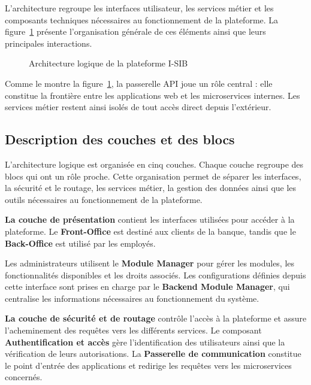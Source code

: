 L'architecture regroupe les interfaces utilisateur, les services métier et les composants techniques nécessaires au fonctionnement de la plateforme. La figure~\ref{fig:architecture_logique} présente l'organisation générale de ces éléments ainsi que leurs principales interactions.




\begin{figure}[H]
    \centering
    \caption{Architecture logique de la plateforme I-SIB}
    \label{fig:architecture_logique}
\end{figure}

Comme le montre la figure~\ref{fig:architecture_logique}, la passerelle API joue
un rôle central : elle constitue la frontière entre les applications web et les
microservices internes. Les services métier restent ainsi isolés de tout accès
direct depuis l'extérieur.
\subsection{Description des couches et des blocs}

L'architecture logique est organisée en cinq couches. Chaque couche regroupe des
blocs qui ont un rôle proche. Cette organisation permet de séparer les
interfaces, la sécurité et le routage, les services métier, la gestion des
données ainsi que les outils nécessaires au fonctionnement de la plateforme.


\textbf{La couche de présentation} contient les interfaces utilisées pour accéder à la plateforme. Le \textbf{Front-Office} est destiné aux clients de la banque, tandis que le \textbf{Back-Office} est utilisé par les employés.

Les administrateurs utilisent le \textbf{Module Manager} pour gérer les modules, les fonctionnalités disponibles et les droits associés. Les configurations définies depuis cette interface sont prises en charge par le \textbf{Backend Module Manager}, qui centralise les informations nécessaires au fonctionnement du système.

\medskip

\textbf{La couche de sécurité et de routage} contrôle l'accès à la plateforme et assure l'acheminement des requêtes vers les différents services. Le composant \textbf{Authentification et accès} gère l'identification des utilisateurs ainsi que la vérification de leurs autorisations. La \textbf{Passerelle de communication} constitue le point d'entrée des applications et redirige les requêtes vers les microservices concernés.

